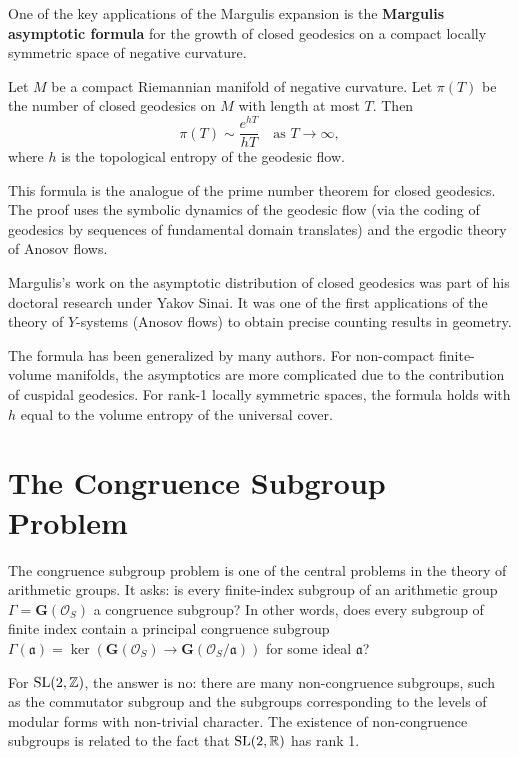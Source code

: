 One of the key applications of the Margulis expansion is the \textbf{Margulis asymptotic formula} for the growth of closed geodesics on a compact locally symmetric space of negative curvature.

\begin{theorem}[Margulis, 1969]
Let \(M\) be a compact Riemannian manifold of negative curvature. Let \(\pi(T)\) be the number of closed geodesics on \(M\) with length at most \(T\). Then
\[
\pi(T) \sim \frac{e^{hT}}{hT} \quad \text{as } T \to \infty,
\]
where \(h\) is the topological entropy of the geodesic flow.
\end{theorem}

This formula is the analogue of the prime number theorem for closed geodesics. The proof uses the symbolic dynamics of the geodesic flow (via the coding of geodesics by sequences of fundamental domain translates) and the ergodic theory of Anosov flows.

Margulis's work on the asymptotic distribution of closed geodesics was part of his doctoral research under Yakov Sinai. It was one of the first applications of the theory of \(Y\)-systems (Anosov flows) to obtain precise counting results in geometry.

The formula has been generalized by many authors. For non-compact finite-volume manifolds, the asymptotics are more complicated due to the contribution of cuspidal geodesics. For rank-1 locally symmetric spaces, the formula holds with \(h\) equal to the volume entropy of the universal cover.

\section{The Congruence Subgroup Problem}

The congruence subgroup problem is one of the central problems in the theory of arithmetic groups. It asks: is every finite-index subgroup of an arithmetic group \(\Gamma = \mathbf{G}(\mathcal{O}_S)\) a congruence subgroup? In other words, does every subgroup of finite index contain a principal congruence subgroup \(\Gamma(\mathfrak{a}) = \ker(\mathbf{G}(\mathcal{O}_S) \to \mathbf{G}(\mathcal{O}_S/\mathfrak{a}))\) for some ideal \(\mathfrak{a}\)?

For \(\operatorname{SL}(2,\mathbb{Z})\), the answer is no: there are many non-congruence subgroups, such as the commutator subgroup and the subgroups corresponding to the levels of modular forms with non-trivial character. The existence of non-congruence subgroups is related to the fact that \(\operatorname{SL}(2,\mathbb{R})\) has rank 1.

